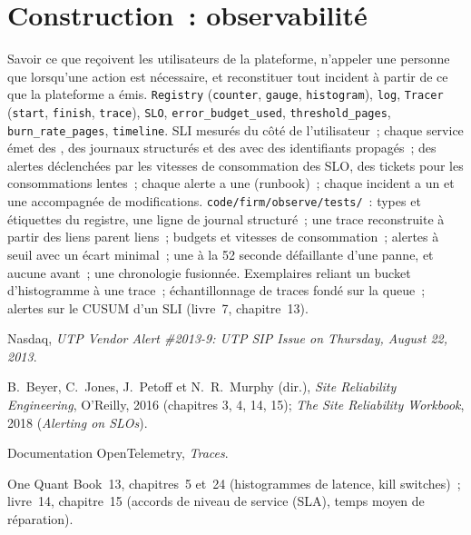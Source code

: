 \section{Construction~: observabilité}\label{bld:pl:observability-and-incident-response:observe}

\begin{build}
 Savoir ce que reçoivent les utilisateurs de la plateforme, n'appeler une personne que lorsqu'une action est nécessaire, et reconstituer tout incident à partir de
ce que la plateforme a émis.
 \texttt{Registry} (\texttt{counter}, \texttt{gauge}, \texttt{histogram}), \texttt{log}, \texttt{Tracer} (\texttt{start},
\texttt{finish}, \texttt{trace}), \texttt{SLO}, \texttt{error\_budget\_used}, \texttt{threshold\_pages}, \texttt{burn\_rate\_pages},
\texttt{timeline}.
 SLI mesurés du côté de l'utilisateur~; chaque service émet des , des journaux structurés et des  avec des identifiants propagés~; des alertes
déclenchées par les vitesses de consommation des SLO, des tickets pour les consommations lentes~; chaque alerte a une  (runbook)~; chaque incident a un  et une  accompagnée
de modifications.
 \texttt{code/firm/observe/tests/}~: types et étiquettes du registre, une ligne de journal structuré~; une trace reconstruite à partir des liens parent
liens~; budgets et vitesses de consommation~; alertes à seuil avec un écart minimal~; une  à la 52 seconde défaillante d'une panne, et aucune avant~; une
chronologie fusionnée.
 Exemplaires reliant un bucket d'histogramme à une trace~; échantillonnage de traces fondé sur la queue~; alertes sur le CUSUM d'un SLI (livre~7,
chapitre~13).
\end{build}

\begin{omsources}
\item Nasdaq, \emph{UTP Vendor Alert \#2013-9: UTP SIP Issue on Thursday, August 22, 2013}.
\item B.~Beyer, C.~Jones, J.~Petoff et N.~R.~Murphy (dir.), \emph{Site Reliability Engineering}, O'Reilly, 2016 (chapitres 3, 4, 14, 15);
\emph{The Site Reliability Workbook}, 2018 (\emph{Alerting on SLOs}).
\item Documentation OpenTelemetry, \emph{Traces}.
\item One Quant Book~13, chapitres~5 et~24 (histogrammes de latence, kill switches)~; livre~14, chapitre~15 (accords de niveau de service (SLA), temps moyen de
réparation).
\end{omsources}

